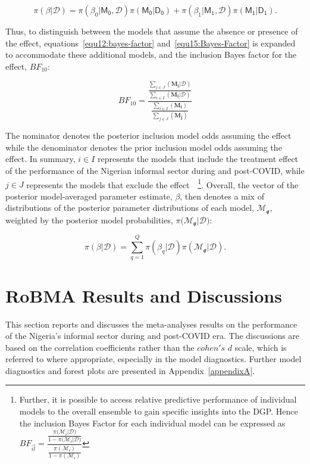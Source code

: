 \documentclass[a4paper, 12pt]{article}
\begin{document}
    \begin{equation}
        \label{equ16}
        \pi(\beta | \mathcal{D}) = \pi(\beta_0 | \mathsf{M_0}, \mathcal{D}) \pi(\mathsf{M_0} | \mathsf{D_0}) + \pi(\beta_1 | \mathsf{M_1}, \mathcal{D}) \pi(\mathsf{M_1} | \mathsf{D_1}).
    \end{equation}

    Thus, to distinguish between the models that assume the absence or presence of the effect, equations~\ref{equ12:bayes-factor} and~\ref{equ15:Bayes-Factor} is expanded to accommodate these additional models, and the inclusion Bayes factor for the effect, $BF_{10}:$

    \begin{equation}
        \label{equ17}
        BF_{10} = \dfrac{\frac{\sum_{j \in J}(\mathbf{M_i} | \mathcal{D})}{\sum_{i \in I}(\mathbf{M_i} | \mathcal{D})}}{\frac{\sum_{i \in I}(\mathbf{M_i})}{\sum_{j \in J}(\mathbf{M_j})}}
    \end{equation}

    The nominator denotes the posterior inclusion model odds assuming the effect while the denominator denotes the prior inclusion model odds assuming the effect. In summary, $i \in I$ represents the models that include the treatment effect of the performance of the Nigerian informal sector during and post-COVID, while $j \in J$ represents the models that exclude the effect~\parencites{gronau2021, hinne2020}~\footnote{Further, it is possible to access relative predictive performance of individual models to the overall ensemble to gain specific insights into the DGP. Hence the inclusion Bayes Factor for each individual model can be expressed as $BF_{\vec{\textit{il}}} = \dfrac{\frac{\pi(\mathcal{M_{\text{i}}|\mathcal{D})}}{1 - \pi(\mathcal{M_{\text{i}}|\mathcal{D})}}}{\frac{\pi(\mathcal{M_{\text{i}}})}{1 - \pi(\mathcal{M_{\text{i}}})}}$}. Overall, the vector of the posterior model-averaged parameter estimate, $\beta$, then denotes a mix of distributions of the posterior parameter distributions of each model, $\mathcal{M_{\text{q}}}$, weighted by the posterior model probabilities, $\pi(\mathcal{M_{\text{q}}|\mathcal{D})}:$

    \begin{equation}
        \label{equ18}
        \pi(\beta | \mathcal{D}) = \sum_{q = 1}^{Q} \pi(\beta_q | \mathcal{D}) \pi(\mathcal{M_\text{q}} | \mathcal{D}).
    \end{equation}


    \section{RoBMA Results and Discussions}\label{sec4:robma-results-and-discussion}
    This section reports and discusses the meta-analyses results on the performance of the Nigeria's informal sector during and post-COVID era. The discussions are based on the correlation coefficients rather than the $cohen's$ $d$ scale, which is referred to where appropriate, especially in the model diagnostics. Further model diagnostics and forest plots are presented in Appendix~\ref{appendixA}.
\end{document}

